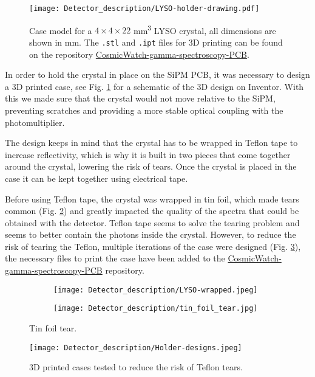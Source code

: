 \begin{figure}[H]
  \centering
  \texttt{[image: Detector\_description/LYSO-holder-drawing.pdf]}
  \caption{Case model for a $4\times4\times22$ \unit{mm\cubed} LYSO crystal, all dimensions are shown in \unit{\mm}. The \texttt{.stl} and \texttt{.ipt} files for 3D printing can be found on the repository \href{https://github.com/anvargasl/CosmicWatch-gamma-spectroscopy-PCB}{CosmicWatch-gamma-spectroscopy-PCB}.}
  \label{fig:3d_case_desing}
\end{figure}

In order to hold the crystal in place on the SiPM PCB, it was necessary to design a 3D printed case, see Fig. \ref{fig:3d_case_desing} for a schematic of the 3D design on Inventor. With this we made sure that the crystal would not move relative to the SiPM, preventing scratches and providing a more stable optical coupling with the photomultiplier.

The design keeps in mind that the crystal has to be wrapped in Teflon tape to increase reflectivity, which is why it is built in two pieces that come together around the crystal, lowering the risk of tears. Once the crystal is placed in the case it can be kept together using electrical tape.

Before using Teflon tape, the crystal was wrapped in tin foil, which made tears common (Fig. \ref{fig:tin_foil_tear}) and greatly impacted the quality of the spectra that could be obtained with the detector. Teflon tape seems to solve the tearing problem and seems to better contain the photons inside the crystal. However, to reduce the risk of tearing the Teflon, multiple iterations of the case were designed (Fig. \ref{fig:3d_previous_desings}), the necessary files to print the case have been added to the \href{https://github.com/anvargasl/CosmicWatch-gamma-spectroscopy-PCB}{CosmicWatch-gamma-spectroscopy-PCB} repository.

\begin{figure}[H]
    \centering
    \begin{subfigure}[t]{0.35\textwidth}
      \texttt{[image: Detector\_description/LYSO-wrapped.jpeg]}
    \end{subfigure}
    \begin{subfigure}[t]{0.35\textwidth}
      \texttt{[image: Detector\_description/tin\_foil\_tear.jpg]}
    \end{subfigure}
    \caption{\label{fig:tin_foil_tear}Tin foil tear.}
\end{figure}

\begin{figure}[H]
    \centering
    \texttt{[image: Detector\_description/Holder-designs.jpeg]}
    \caption{3D printed cases tested to reduce the risk of Teflon tears.}
    \label{fig:3d_previous_desings}
\end{figure}
